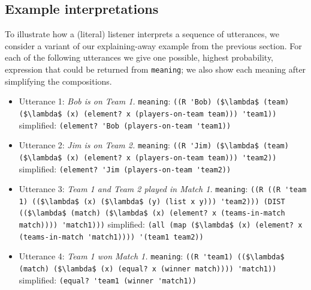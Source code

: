 \documentclass[pdfextras]{handbook}
\begin{document}
\subsection{Example interpretations}

To illustrate how a (literal) listener interprets a sequence of utterances, we consider a variant of our explaining-away example from the previous section. 
For each of the following utterances we give one possible, highest probability, expression that could be returned from \lstinline{meaning}; we also show each meaning after simplifying the compositions.

\begin{itemize}
\item Utterance 1: \emph{Bob is on Team 1.}
\subitem \lstinline{meaning}: \lstinline[mathescape]{((R 'Bob) ($\lambda$ (team) ($\lambda$ (x) (element? x (players-on-team team))) 'team1))}
\subitem simplified: \lstinline{(element? 'Bob (players-on-team 'team1))}
%
\item Utterance 2: \emph{Jim is on Team 2.}
\subitem \lstinline{meaning}: \lstinline[mathescape]{((R 'Jim) ($\lambda$ (team) ($\lambda$ (x) (element? x (players-on-team team))) 'team2))}
\subitem simplified: \lstinline{(element? 'Jim (players-on-team 'team2))}
%
\item Utterance 3: \emph{Team 1 and Team 2 played in Match 1.}
\subitem \lstinline{meaning}: \lstinline[mathescape]{((R ((R 'team 1) (($\lambda$ (x) ($\lambda$ (y) (list x y))) 'team2))) (DIST (($\lambda$ (match) ($\lambda$ (x) (element? x (teams-in-match match)))) 'match1)))}
\subitem simplified: \lstinline[mathescape]{(all (map ($\lambda$ (x) (element? x (teams-in-match 'match1)))) '(team1 team2))} 
%
\item Utterance 4: \emph{Team 1 won Match 1.}
\subitem \lstinline{meaning}:  \lstinline[mathescape]{((R 'team1) (($\lambda$ (match) ($\lambda$ (x) (equal? x (winner match)))) 'match1))}
\subitem simplified: \lstinline{(equal? 'team1 (winner 'match1))}
\end{itemize}
\end{document}
